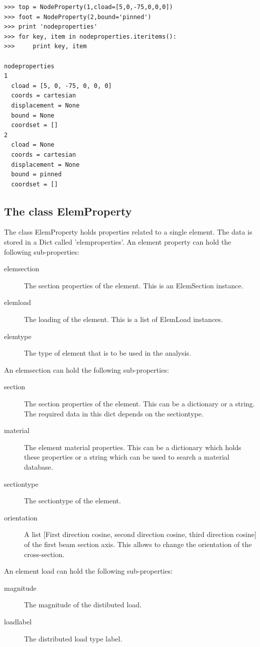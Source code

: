 \begin{verbatim}
>>> top = NodeProperty(1,cload=[5,0,-75,0,0,0])
>>> foot = NodeProperty(2,bound='pinned')
>>> print 'nodeproperties'    
>>> for key, item in nodeproperties.iteritems():
>>>     print key, item

nodeproperties
1
  cload = [5, 0, -75, 0, 0, 0]
  coords = cartesian
  displacement = None
  bound = None
  coordset = []
2
  cload = None
  coords = cartesian
  displacement = None
  bound = pinned
  coordset = []
\end{verbatim}

\subsection{The class ElemProperty}
The class ElemProperty holds properties related to a single element. The data is stored in a Dict called 'elemproperties'. An element property can hold the following sub-properties:
\begin{description}
\item [elemsection] The section properties of the element. This is an ElemSection instance.
\item [elemload] The loading of the element. This is a list of ElemLoad instances.
\item [elemtype] The type of element that is to be used in the analysis. 
\end{description}

An elemsection can hold the following sub-properties:
\begin{description}
\item [section] The section properties of the element. This can be a dictionary or a string. The required data in this dict depends on the sectiontype. 
\item [material] The element material properties. This can be a dictionary which holds these properties or a string which can be used to search a material database. 
\item [sectiontype] The sectiontype of the element. 
\item [orientation]  A list [First direction cosine, second direction cosine, third direction cosine] of the first beam section axis. This allows to change the orientation of the cross-section.
\end{description}

An element load can hold the following sub-properties:
\begin{description}
\item [magnitude] The magnitude of the distibuted load.
\item [loadlabel] The distributed load type label.
\end{description}

